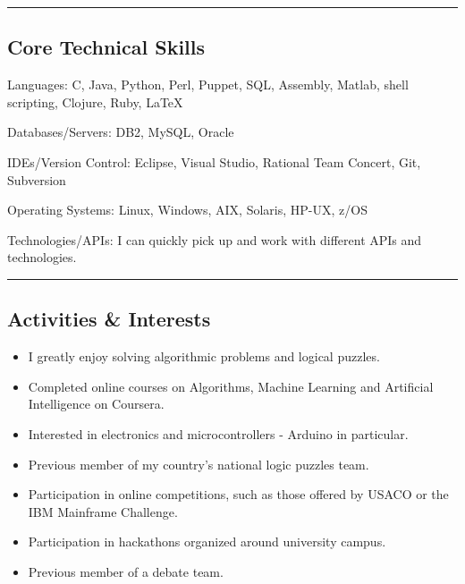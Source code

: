 \documentclass[10pt,letterpaper]{article}
\newenvironment{indentsection}[1]%
{\begin{list}{}%
    {\setlength{\leftmargin}{#1}}%
    \item[]%
}
{\end{list}}
\begin{document}
\hrule
\vspace{-0.4em}
\subsection*{Core Technical Skills}

\begin{indentsection}{\parindent}
\begin{description*}
    \item[Languages:]
    C, Java, Python, Perl, Puppet, SQL, Assembly, Matlab, shell scripting, Clojure, Ruby, \LaTeX
    \item[Databases/Servers:]
    DB2, MySQL, Oracle
    \item[IDEs/Version Control:]
    Eclipse, Visual Studio, Rational Team Concert, Git, Subversion
    \item[Operating Systems:]
    Linux, Windows, AIX, Solaris, HP-UX, z/OS
    \item[Technologies/APIs:]
    I can quickly pick up and work with different APIs and technologies.

\end{description*}
\end{indentsection}

\hrule
\vspace{-0.4em}
\subsection*{Activities \& Interests}

\begin{itemize}
    \parskip=0.1em

    \item I greatly enjoy solving algorithmic problems and logical puzzles.
    \item Completed online courses on Algorithms, Machine Learning and Artificial Intelligence on Coursera.
    \item Interested in electronics and microcontrollers - Arduino in particular.
    \item Previous member of my country's national logic puzzles team.
    \item Participation in online competitions, such as those offered by USACO or the IBM Mainframe Challenge.
    \item Participation in hackathons organized around university campus.
    \item Previous member of a debate team.

\end{itemize}
\end{document}

